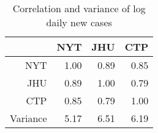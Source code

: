 \begin{table}[ht]
\centering
\begin{tabular}{rrrr}
  \hline
 & NYT & JHU & CTP \\ 
  \hline
NYT & 1.00 & 0.89 & 0.85 \\ 
  JHU & 0.89 & 1.00 & 0.79 \\ 
  CTP & 0.85 & 0.79 & 1.00 \\ 
  Variance & 5.17 & 6.51 & 6.19 \\ 
   \hline
\end{tabular}
\caption{Correlation and variance of log daily new cases\label{tab:newcasecor}} 
\end{table}
